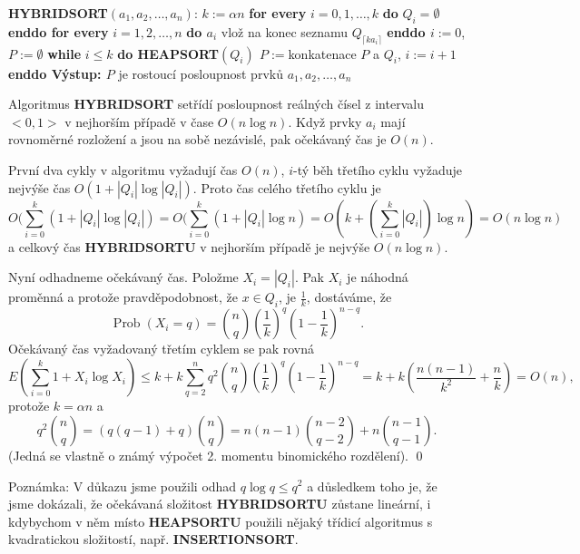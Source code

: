 \documentclass[a4paper,12pt]{article}
\DeclareMathOperator*{\Prob}{Prob}
\begin{document}
{\bf HYBRIDSORT$(a_1,a_2,\dots,a_n)$}:\newline 
$k:=\alpha n$\newline 
{\bf for every} $i=0,1,\dots,k$ {\bf do} $Q_i=\emptyset$ {\bf enddo\newline 
for every} $i=1,2,\dots,n$ {\bf do\newline 
\phantom{{\rm ---}}$a_i$} vlož na konec seznamu $Q_{\lceil ka_
i\rceil}$\newline 
{\bf enddo\newline 
$i:=0$}, $P:=\emptyset$\newline 
{\bf while} $i\le k$ {\bf do\newline 
\phantom{{\rm ---}}HEAPSORT$(Q_i)$
$P:=$}konkatenace $P$ a $Q_i$, $i:=i+1$\newline 
{\bf enddo\newline 
Výstup: $P$} je rostoucí posloupnost prvků 
$a_1,a_2,\dots,a_n$

\begin{veta}Algoritmus {\bf HYBRIDSORT} setřídí 
posloupnost reál\-ných čísel z intervalu $<0,1>$ v 
nejhorším případě v čase $O(n\log n)$. Když prvky $
a_i$ 
mají rovnoměrné rozložení a jsou na sobě nezá\-vislé, 
pak očekávaný čas je $O(n)$.
\end{veta}

První dva cykly v algoritmu 
vyžadují čas $O(n)$, $i$-tý běh třetího cyklu vyžaduje 
nejvýše čas $O(1+|Q_i|\log|Q_i|)$. Proto čas celého třetího cyklu je 
$$O(\sum_{i=0}^k(1+|Q_i|\log|Q_i|)=O(\sum_{i=0}^k(1+|Q_i|\log n)=
O(k+(\sum_{i=0}^k|Q_i|)\log n)=O(n\log n)$$
a celkový čas {\bf HYBRIDSORTU} v nejhorším případě je nejvýše $
O(n\log n)$.

Nyní odhadneme očekávaný čas. Položme 
$X_i=|Q_i|$. Pak 
$X_i$ je ná\-hodná proměnná a 
protože pravděpodobnost, že $x\in Q_i$, je $\frac 1k$, dostá\-váme, že 
$$\Prob(X_i=q)=\binom nq(\frac 1k)^q(1-\frac 1k)^{n-q}.$$
Očekávaný čas vyžadovaný třetím cyklem se pak rovná 
$$E(\sum_{i=0}^k1+X_i\log X_i)\le k+k\sum_{q=2}^nq^2\binom nq(\frac 
1k)^q(1-\frac 1k)^{n-q}=k+k(\frac {n(n-1)}{k^2}+\frac nk)=O(n),$$
protože $k=\alpha n$ a 
$$q^2\binom nq=(q(q-1)+q)\binom nq=n(n-1)\binom {n-2}{q-2}+n\binom {
n-1}{q-1}.$$
(Jedná se vlastně o známý výpočet 2. momentu 
binomického rozdělení). \qed
\enddemo

Poznámka: V důkazu jsme použili odhad 
$q\log q\le q^2$ a důsledkem toho je, že jsme 
dokázali, že očekávaná složitost {\bf HYBRIDSORTU }
zůstane lineární, i kdybychom v něm místo 
{\bf HEAPSORTU} použili nějaký třídicí algoritmus s 
kvadratickou složitostí, např. {\bf INSERTIONSORT}.
\end{document}
